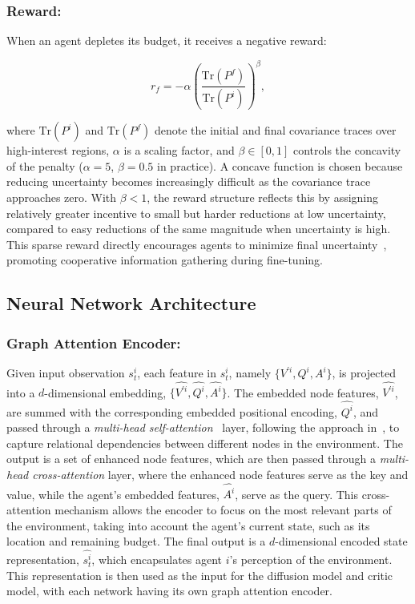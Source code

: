 \documentclass[runningheads]{llncs}
\begin{document}
\subsubsection{Reward:}
When an agent depletes its budget, it receives a negative reward:

\begin{equation}
    r_f = -\alpha \left( \frac{\text{Tr}(P^f)}{\text{Tr}(P^i)} \right)^\beta,
\end{equation}

where $\text{Tr}(P^i)$ and $\text{Tr}(P^f)$ denote the initial and final covariance traces over high-interest regions, $\alpha$ is a scaling factor, and $\beta\in[0,1]$ controls the concavity of the penalty ($\alpha=5$, $\beta=0.5$ in practice). A concave function is chosen because reducing uncertainty becomes increasingly difficult as the covariance trace approaches zero. With $\beta<1$, the reward structure reflects this by assigning relatively greater incentive to small but harder reductions at low uncertainty, compared to easy reductions of the same magnitude when uncertainty is high. This sparse reward directly encourages agents to minimize final uncertainty~\cite{yang2023intentmaipp}, promoting cooperative information gathering during fine-tuning.

\subsection{Neural Network Architecture}
\subsubsection{Graph Attention Encoder:}
Given input observation $s_t^i$, each feature in $s_t^i$, namely $\{V^{'i}, Q^i, A^i\}$, is projected into a $d$-dimensional embedding, $\{\hat{V^{'i}}, \hat{Q^i}, \hat{A^i}\}$. The embedded node features, $\hat{V^{'i}}$, are summed with the corresponding embedded positional encoding, $\hat{Q^i}$, and passed through a \textit{multi-head self-attention}~\cite{vaswani2017attention} layer, following the approach in~\cite{cao2023catnipp,yang2023intentmaipp}, to capture relational dependencies between different nodes in the environment. The output is a set of enhanced node features, which are then passed through a \textit{multi-head cross-attention} layer, where the enhanced node features serve as the key and value, while the agent's embedded features, $\hat{A^i}$, serve as the query. This cross-attention mechanism allows the encoder to focus on the most relevant parts of the environment, taking into account the agent's current state, such as its location and remaining budget. The final output is a $d$-dimensional encoded state representation, $\hat{s_t^i}$, which encapsulates agent $i$'s perception of the environment. This representation is then used as the input for the diffusion model and critic model, with each network having its own graph attention encoder.
\end{document}
